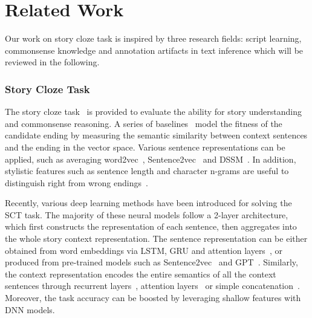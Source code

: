 \section{Related Work}
\label{sec:related}

Our work on story cloze task is inspired by three research fields: script learning, commonsense knowledge and annotation artifacts in text inference  which will be reviewed in the following.

\subsubsection*{Story Cloze Task}
The story cloze task~\cite{mostafazadeh2016corpus} is provided 
to evaluate the ability for story understanding and 
commonsense reasoning. A series of baselines~\cite{mihaylov2017story,mostafazadeh2016story}
model the fitness of the candidate ending
by measuring the semantic similarity between context sentences 
and the ending in the vector space.
Various sentence representations can be applied,
such as averaging word2vec~\cite{mikolov2013distributed},
Sentence2vec~\cite{kiros2015skip} and DSSM~\cite{huang2013learning}.
In addition, stylistic features such as sentence length and
character n-grams are useful to distinguish
right from wrong endings~\cite{schwartz2017story}. 

Recently, various deep learning methods have been introduced for
solving the SCT task.
The majority of these neural models follow a 2-layer architecture,
which first constructs the representation of each sentence,
then aggregates into the whole story context representation.
The sentence representation can be either obtained from word embeddings
via LSTM, GRU and attention layers~\cite{wang2017conditional,zhou2019story},
or produced from pre-trained models such as
Sentence2vec~\cite{roemmele2017rnn,srinivasan2018simple} and
GPT~\cite{radford2018improving,chen2018incorporating}.
Similarly, the context representation encodes the entire semantics
of all the context sentences through recurrent layers~\cite{cai2017pay},
attention layers~\cite{li2018multi}
or simple concatenation~\cite{bugert2017lsdsem}.
Moreover, the task accuracy can be boosted by leveraging shallow features with DNN models.


